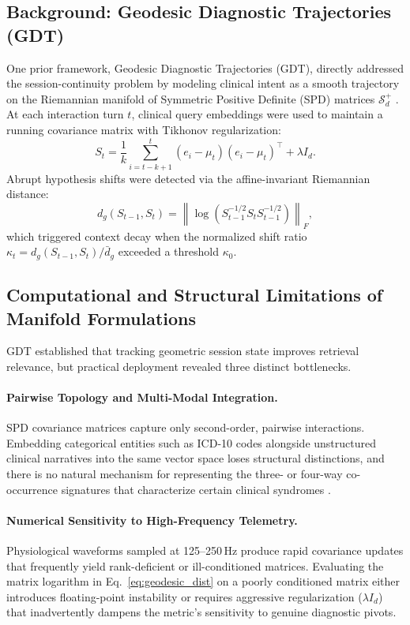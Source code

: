 \documentclass[10pt, onecolumn]{article}
\newcommand{\norm}[1]{\left\lVert#1\right\rVert}
\begin{document}
\subsection{Background: Geodesic Diagnostic Trajectories (GDT)}

One prior framework, Geodesic Diagnostic Trajectories (GDT), directly addressed the session-continuity problem by modeling clinical intent as a smooth trajectory on the Riemannian manifold of Symmetric Positive Definite (SPD) matrices $\mathcal{S}_d^+$ \cite{arsigny2007geometric,pennec2006riemannian,moakher2005differential}. At each interaction turn $t$, clinical query embeddings were used to maintain a running covariance matrix with Tikhonov regularization:
\begin{equation}
  S_t = \frac{1}{k}\sum_{i=t-k+1}^{t}(e_i - \mu_t)(e_i - \mu_t)^\top + \lambda I_d.
  \label{eq:spd_matrix}
\end{equation}
Abrupt hypothesis shifts were detected via the affine-invariant Riemannian distance:
\begin{equation}
  d_g(S_{t-1},S_t)=\norm{\log\!\left(S_{t-1}^{-1/2} S_t S_{t-1}^{-1/2}\right)}_F,
  \label{eq:geodesic_dist}
\end{equation}
which triggered context decay when the normalized shift ratio $\kappa_t = d_g(S_{t-1},S_t)/\bar{d}_g$ exceeded a threshold $\kappa_0$.

\subsection{Computational and Structural Limitations of Manifold Formulations}

GDT established that tracking geometric session state improves retrieval relevance, but practical deployment revealed three distinct bottlenecks.

\paragraph{Pairwise Topology and Multi-Modal Integration.}
SPD covariance matrices capture only second-order, pairwise interactions. Embedding categorical entities such as ICD-10 codes alongside unstructured clinical narratives into the same vector space loses structural distinctions, and there is no natural mechanism for representing the three- or four-way co-occurrence signatures that characterize certain clinical syndromes \cite{feng2019hypergraph,gao2022hgnnplus}.

\paragraph{Numerical Sensitivity to High-Frequency Telemetry.}
Physiological waveforms sampled at 125--250\,Hz \cite{gu2023mamba,hyland2020hirid} produce rapid covariance updates that frequently yield rank-deficient or ill-conditioned matrices. Evaluating the matrix logarithm in Eq.~\eqref{eq:geodesic_dist} on a poorly conditioned matrix either introduces floating-point instability or requires aggressive regularization ($\lambda I_d$) that inadvertently dampens the metric's sensitivity to genuine diagnostic pivots.
\end{document}
